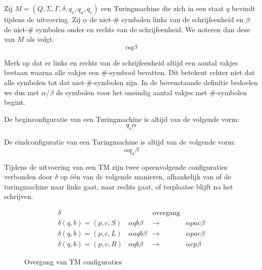 \documentclass[main.tex]{subfiles}
\begin{document}
\begin{de}
  Zij $M = (Q,\Sigma,\Gamma, \delta, q_{s}, q_{a}, q_{r})$ een Turingmachine die zich in een staat $q$ bevindt tijdens de uitvoering. 
  Zij $\alpha$ de niet-$\#$ symbolen links van de schrijfeenheid en $\beta$ de niet-$\#$ symbolen onder en rechts van de schrijfeenheid.
  We noteren dan deze  van $M$ als volgt.
  \[ \alpha q \beta \]
\end{de}

\begin{opm}
  Merk op dat er links en rechts van de schrijfeenheid altijd een aantal vakjes bestaan waarna alle vakjes een $\#$-symbool bevatten.
  Dit betekent echter niet dat alle symbolen tot dat niet-$\#$-symbolen zijn.
  In de bovenstaande definitie bedoelen we dus met $\alpha$/$\beta$ de symbolen voor het oneindig aantal vakjes met $\#$-symbolen begint.
\end{opm}

\begin{opm}
  De beginconfiguratie van een Turingmachine is altijd van de volgende vorm:
  \[ q_{s}\alpha \]
\end{opm}

\begin{opm}
  De eindconfiguratie van een Turingmachine is altijd van de volgende vorm:
  \[ \alpha q_{a} \beta \]
\end{opm}

\begin{opm}
  Tijdens de uitvoering van een TM zijn twee opeenvolgende configuraties verbonden door $\delta$ op \'e\'en van de volgende manieren, afhankelijk van of de turingmachine naar links gaat, naar rechts gaat, of terplaatse blijft na het schrijven.

  \begin{figure}[H]
    \centering
    \[
    \begin{array}{c|ccc}
      \delta & &\text{overgang}&\\
      \hline
      \delta(q,b) = (p,c,S) & \alpha q b \beta &\rightarrow& \alpha p a c \beta\\
      \delta(q,b) = (p,c,L) & \alpha a q b \beta &\rightarrow& \alpha p a c \beta\\ 
      \delta(q,b) = (p,c,R) & \alpha q b \beta &\rightarrow& \alpha c p \beta
    \end{array}
    \]
    \caption{Overgang van TM configuraties}
    \label{overgang-tm-configuraties}
  \end{figure}
\end{opm}
\end{document}
